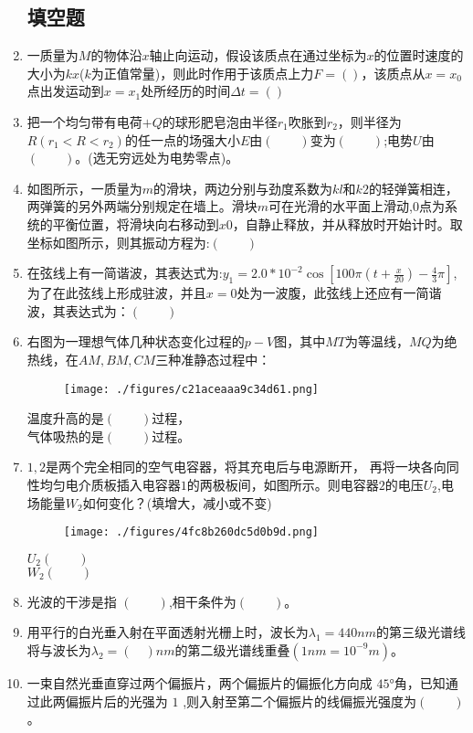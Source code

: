\begin{enumerate}
\subsection{填空题}
\item 一质量为$M$的物体沿$x$轴止向运动，假设该质点在通过坐标为$x$的位置时速度的大小为$kx$($k$为正值常量)，则此时作用于该质点上力$F=()$，该质点从$x=x_0$点出发运动到$x=x_1$处所经历的时间$\Delta t=()$\\
\item 把一个均匀带有电荷$+Q$的球形肥皂泡由半径$r_1$吹胀到$r_2$，则半径为$R(r_1<R<r_2)$的任一点的场强大小$E$由$(\qquad)$变为$(\qquad)$;电势$U$由$(\qquad)$。(选无穷远处为电势零点)。
\item 如图所示，一质量为$m$的滑块，两边分别与劲度系数为$kl$和$k2$的轻弹簧相连，两弹簧的另外两端分别规定在墙上。滑块$m$可在光滑的水平面上滑动,$0$点为系统的平衡位置，将滑块向右移动到$x0$，自静止释放，并从释放时开始计时。取坐标如图所示，则其振动方程为:$(\qquad)$
\item 在弦线上有一简谐波，其表达式为:$y_1=2.0*10^{-2} \cos[100\pi(t+\frac{x}{20})-\frac{4}{3}\pi]$,为了在此弦线上形成驻波，并且$x=0$处为一波腹，此弦线上还应有一简谐波，其表达式为：$(\qquad)$
\item 右图为一理想气体几种状态变化过程的$p-V$图，其中$MT$为等温线，$MQ$为绝热线，在$AM,BM,CM$三种准静态过程中：\\
\begin{figure}[ht]
\centering
\texttt{[image: ./figures/c21aceaaa9c34d61.png]}
\caption{} \label{fig_BKDP06_9}
\end{figure}
温度升高的是$(\qquad)$过程，\\
气体吸热的是$(\qquad)$过程。
\item $1,2$是两个完全相同的空气电容器，将其充电后与电源断开， 再将一块各向同性均匀电介质板插入电容器$1$的两极板间，如图所示。则电容器$2$的电压$U_2$,电场能量$W_2$如何变化？(填增大，减小或不变)\\
\begin{figure}[ht]
\centering
\texttt{[image: ./figures/4fc8b260dc5d0b9d.png]}
\caption{} \label{fig_BKDP06_8}
\end{figure}
$U_2(\qquad)$\\
$W_2(\qquad)$
\item 光波的干涉是指 $(\qquad)$,相干条件为$(\qquad)$。
\item  用平行的白光垂入射在平面透射光栅上时，波长为$\lambda_1=440nm $的第三级光谱线将与波长为$\lambda_2=(\quad)nm$的第二级光谱线重叠$(1nm=10^{-9}m)$。
\item 一束自然光垂直穿过两个偏振片，两个偏振片的偏振化方向成 $45$°角，已知通过此两偏振片后的光强为 $1$ ,则入射至第二个偏振片的线偏振光强度为$(\qquad)$。

\end{enumerate}
